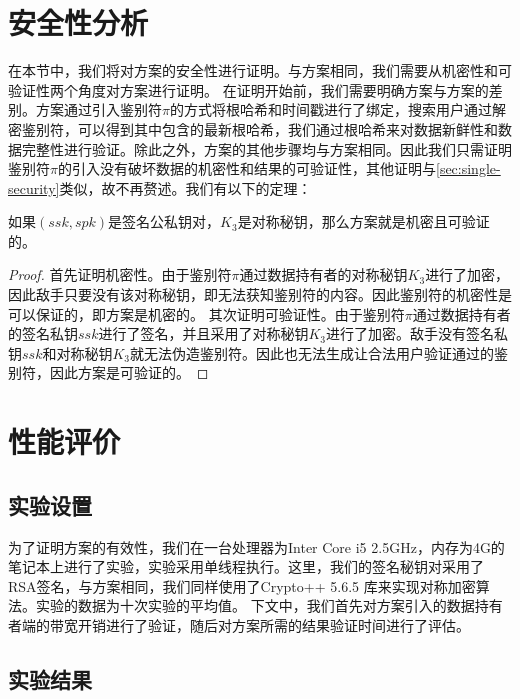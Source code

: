 \section{安全性分析}
在本节中，我们将对\multi 方案的安全性进行证明。与\single 方案相同，我们需要从机密性和可验证性两个角度对\multi 方案进行证明。
在证明开始前，我们需要明确\multi 方案与\single 方案的差别。\multi 方案通过引入鉴别符$\pi$的方式将根哈希和时间戳进行了绑定，搜索用户通过解密鉴别符，可以得到其中包含的最新根哈希，我们通过根哈希来对数据新鲜性和数据完整性进行验证。除此之外，\multi 方案的其他步骤均与\single 方案相同。因此我们只需证明鉴别符$\pi$的引入没有破坏数据的机密性和结果的可验证性，其他证明与\ref{sec:single-security}类似，故不再赘述。我们有以下的定理：
\begin{theorem}
    如果$(ssk,spk)$是签名公私钥对，$K_3$是对称秘钥，那么\multi 方案就是机密且可验证的。
\end{theorem}

\begin{proof}
    首先证明机密性。由于鉴别符$\pi$通过数据持有者的对称秘钥$K_3$进行了加密，因此敌手只要没有该对称秘钥，即无法获知鉴别符的内容。因此鉴别符的机密性是可以保证的，即\multi 方案是机密的。
    其次证明可验证性。由于鉴别符$\pi$通过数据持有者的签名私钥$ssk$进行了签名，并且采用了对称秘钥$K_3$进行了加密。敌手没有签名私钥$ssk$和对称秘钥$K_3$就无法伪造鉴别符。因此也无法生成让合法用户验证通过的鉴别符，因此\multi 方案是可验证的。
\end{proof}

\section{性能评价}
\subsection{实验设置}
为了证明\multi 方案的有效性，我们在一台处理器为Inter Core i5 2.5GHz，内存为4G的笔记本上进行了实验，实验采用单线程执行。这里，我们的签名秘钥对采用了RSA签名，与\single 方案相同，我们同样使用了Crypto++ 5.6.5 库来实现对称加密算法。实验的数据为十次实验的平均值。
下文中，我们首先对\multi 方案引入的数据持有者端的带宽开销进行了验证，随后对\multi 方案所需的结果验证时间进行了评估。
\subsection{实验结果}
\label{sec:experiments}

